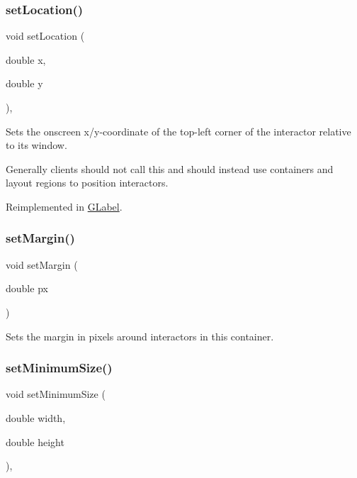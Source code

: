 \subsubsection{\texorpdfstring{set\+Location()}{setLocation()}}
{\footnotesize\ttfamily void set\+Location (\begin{DoxyParamCaption}\item[{double}]{x,  }\item[{double}]{y }\end{DoxyParamCaption})\hspace{0.3cm}{\ttfamily [virtual]}, {\ttfamily [inherited]}}



Sets the onscreen x/y-\/coordinate of the top-\/left corner of the interactor relative to its window. 

Generally clients should not call this and should instead use containers and layout regions to position interactors. 

Reimplemented in \mbox{\hyperlink{classGLabel_ae3b17c0aeb355dc23c4e4cbf066e81f7}{G\+Label}}.

\mbox{\label{classGContainer_a79b7a5ffc0a63c8f11be4ed59808f60d}} 
\subsubsection{\texorpdfstring{set\+Margin()}{setMargin()}}
{\footnotesize\ttfamily void set\+Margin (\begin{DoxyParamCaption}\item[{double}]{px }\end{DoxyParamCaption})\hspace{0.3cm}{\ttfamily [virtual]}}



Sets the margin in pixels around interactors in this container. 

\mbox{\label{classGInteractor_a0cf428e207b7f22cc08138a90b1b87b2}} 
\subsubsection{\texorpdfstring{set\+Minimum\+Size()}{setMinimumSize()}\hspace{0.1cm}{\footnotesize\ttfamily [1/2]}}
{\footnotesize\ttfamily void set\+Minimum\+Size (\begin{DoxyParamCaption}\item[{double}]{width,  }\item[{double}]{height }\end{DoxyParamCaption})\hspace{0.3cm}{\ttfamily [virtual]}, {\ttfamily [inherited]}}



